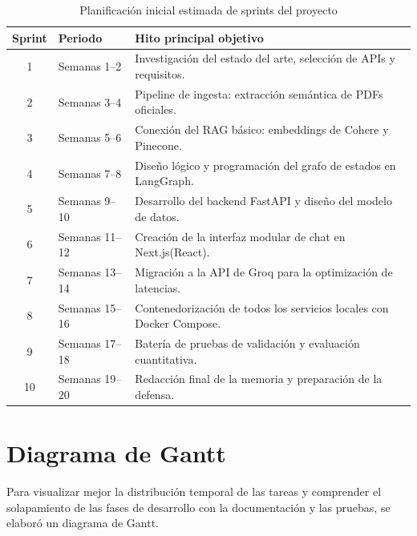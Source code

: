 \documentclass[12pt,a4paper,oneside]{report}
\begin{document}
\begin{table}[H]
    \centering
    \caption{Planificación inicial estimada de sprints del proyecto}
    \begin{tabular}{@{}clp{8cm}@{}}
        \toprule
        \textbf{Sprint} & \textbf{Periodo} & \textbf{Hito principal objetivo}                                      \\
        \midrule
        1               & Semanas 1--2     & Investigación del estado del arte, selección de APIs y requisitos.    \\
        2               & Semanas 3--4     & Pipeline de ingesta: extracción semántica de PDFs oficiales.          \\
        3               & Semanas 5--6     & Conexión del RAG básico: embeddings de Cohere y Pinecone.             \\
        4               & Semanas 7--8     & Diseño lógico y programación del grafo de estados en LangGraph.       \\
        5               & Semanas 9--10    & Desarrollo del backend FastAPI y diseño del modelo de datos.         \\
        6               & Semanas 11--12   & Creación de la interfaz modular de chat en Next.js(React).                     \\
        7               & Semanas 13--14   & Migración a la API de Groq para la optimización de latencias.        \\
        8               & Semanas 15--16   & Contenedorización de todos los servicios locales con Docker Compose.  \\
        9               & Semanas 17--18   & Batería de pruebas de validación y evaluación cuantitativa.           \\
        10              & Semanas 19--20   & Redacción final de la memoria y preparación de la defensa.            \\
        \bottomrule
    \end{tabular}
\end{table}

\section{Diagrama de Gantt}

Para visualizar mejor la distribución temporal de las tareas y comprender el solapamiento de las fases de desarrollo con la documentación y las pruebas, se elaboró un diagrama de Gantt. 
\end{document}
